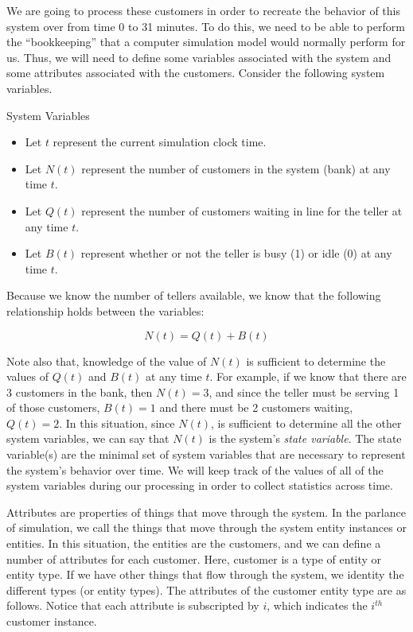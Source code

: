 \documentclass[
]{book}
\theoremstyle{definition}
\theoremstyle{definition}
\theoremstyle{definition}
\theoremstyle{definition}
\theoremstyle{remark}
\begin{document}
We are going to process these customers in order to recreate the
behavior of this system over from time 0 to 31 minutes. To do this, we
need to be able to perform the ``bookkeeping'' that a computer simulation
model would normally perform for us. Thus, we will need to define some
variables associated with the system and some attributes associated with
the customers. Consider the following system variables.

System Variables

\begin{itemize}
\item
  Let \(t\) represent the current simulation clock time.
\item
  Let \(N(t)\) represent the number of customers in the system (bank) at
  any time \(t\).
\item
  Let \(Q(t)\) represent the number of customers waiting in line for the
  teller at any time \(t\).
\item
  Let \(B(t)\) represent whether or not the teller is busy (1) or
  idle (0) at any time \(t\).
\end{itemize}

Because we know the number of tellers available, we know that the
following relationship holds between the variables:

\[N\left( t \right) = Q\left( t \right) + B(t)\]

Note also that, knowledge of the value of \(N(t)\) is sufficient to
determine the values of \(Q(t)\) and \(B(t)\) at any time \(t.\) For example,
if we know that there are 3 customers in the bank, then
\(N\left( t \right) = 3\), and since the teller must be serving 1 of those
customers, \(B\left( t \right) = 1\) and there must be 2 customers
waiting, \(Q\left( t \right) = 2\). In this situation, since
\(N\left( t \right)\), is sufficient to determine all the other system
variables, we can say that \(N\left( t \right)\) is the system's \emph{state
variable}. The state variable(s) are the minimal set of system
variables that are necessary to represent the system's behavior over
time. We will keep track of the values of all of the system variables
during our processing in order to collect statistics across time.

Attributes are properties of things that move through the system. In the parlance of simulation, we call the things that move through the system entity instances or entities. In this situation, the entities are the customers, and we can define a number of attributes for each customer. Here, customer is a type of entity or entity type. If we have other things that flow through the system, we identity the different types (or entity types). The attributes of the customer entity type are as follows. Notice that each attribute is subscripted by \(i\), which indicates the \(i^{th}\) customer instance.
\end{document}
